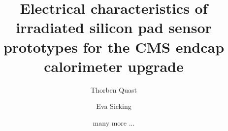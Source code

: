 \documentclass[a4paper,11pt]{article}
\title{\boldmath Electrical characteristics of irradiated silicon pad sensor prototypes for the CMS endcap calorimeter upgrade}
\author[a]{Thorben Quast}
\author[a]{Eva Sicking}
\author[a]{many more ...}
\affiliation[a]{CERN EP-DT}
\begin{document}
\maketitle
\flushbottom

\linenumbers









\appendix




\end{document}
